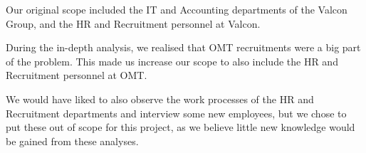 Our original scope included the IT and Accounting departments of the Valcon Group, and the HR and Recruitment personnel at Valcon.

During the in-depth analysis, we realised that OMT recruitments were a big part of the problem.
This made us increase our scope to also include the HR and Recruitment personnel at OMT.

We would have liked to also observe the work processes of the HR and Recruitment departments and interview some new employees, but we chose to put these out of scope for this project, as we believe little new knowledge would be gained from these analyses.